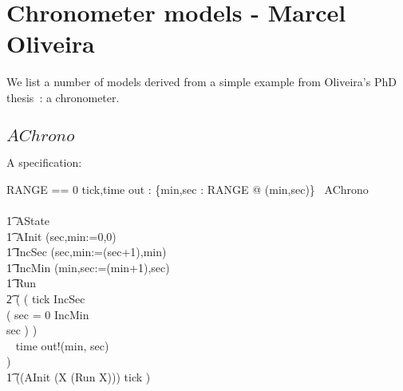 \section{Chronometer models - Marcel Oliveira~\cite{MV05}}

We list a number of models derived from a simple example from
Oliveira's PhD thesis~\cite{MV05}: a chronometer.

\subsection{$AChrono$}
A specification:
\begin{circus}
RANGE == 0 
\also \circchannel tick,time
\also \circchannel out : \{min,sec : RANGE @ (min,sec)\}
\also
\circprocess\ AChrono \circdef\\
\circbegin\\
\t1 \circstate AState \\
\t1 AInit \circdef (sec,min:=0,0)\\
\t1 IncSec \circdef (sec,min:=(sec+1),min)\\
\t1 IncMin \circdef (min,sec:=(min+1),sec)\\
\t1 Run \circdef \\
\t2 (
(
  tick \then IncSec \circseq \\
      (
        \circif sec = 0 \circthen IncMin\\
        \circelse sec  \circthen \Skip \circfi
      )
)\\
    \extchoice~ time \then out!(min, sec) \then \Skip \\
)\\
\t1 \circspot ((AInit \circseq (\circmu X \circspot (Run \circseq X))) \circhide \lchanset tick \rchanset)\\
\circend
\end{circus}

